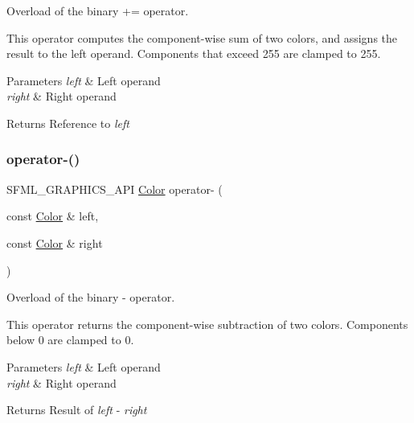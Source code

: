 Overload of the binary += operator. 

This operator computes the component-\/wise sum of two colors, and assigns the result to the left operand. Components that exceed 255 are clamped to 255.


\begin{DoxyParams}{Parameters}
{\em left} & Left operand \\
\hline
{\em right} & Right operand\\
\hline
\end{DoxyParams}
\begin{DoxyReturn}{Returns}
Reference to {\itshape left} \begin{DoxyVerb}\end{DoxyVerb}
 
\end{DoxyReturn}
\mbox{\label{classsf_1_1_color_a6d9047ddbcec2bbab8519d93300bb2aa}} 
\subsubsection{\texorpdfstring{operator-\/()}{operator-()}}
{\footnotesize\ttfamily S\+F\+M\+L\+\_\+\+G\+R\+A\+P\+H\+I\+C\+S\+\_\+\+A\+PI \mbox{\hyperlink{classsf_1_1_color}{Color}} operator-\/ (\begin{DoxyParamCaption}\item[{const \mbox{\hyperlink{classsf_1_1_color}{Color}} \&}]{left,  }\item[{const \mbox{\hyperlink{classsf_1_1_color}{Color}} \&}]{right }\end{DoxyParamCaption})\hspace{0.3cm}{\ttfamily [related]}}



Overload of the binary -\/ operator. 

This operator returns the component-\/wise subtraction of two colors. Components below 0 are clamped to 0.


\begin{DoxyParams}{Parameters}
{\em left} & Left operand \\
\hline
{\em right} & Right operand\\
\hline
\end{DoxyParams}
\begin{DoxyReturn}{Returns}
Result of {\itshape left} -\/ {\itshape right} \begin{DoxyVerb}\end{DoxyVerb}
 
\end{DoxyReturn}
\mbox{\label{classsf_1_1_color_a86ceee6b959136932020db4036918ecd}} 
